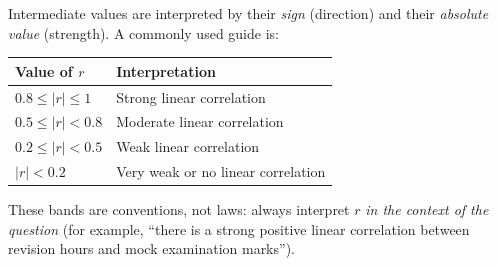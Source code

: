 \documentclass[11pt]{article}
\begin{document}
Intermediate values are interpreted by their \emph{sign} (direction) and their \emph{absolute value} (strength). A commonly used guide is:

\begin{center}
\begin{tabularx}{\linewidth}{|l|X|}
\hline
\rowcolor{popblueL} Value of $r$ & Interpretation \\
\hline
$0.8 \le |r| \le 1$ & Strong linear correlation \\
\hline
$0.5 \le |r| < 0.8$ & Moderate linear correlation \\
\hline
$0.2 \le |r| < 0.5$ & Weak linear correlation \\
\hline
$|r| < 0.2$ & Very weak or no linear correlation \\
\hline
\end{tabularx}
\end{center}

These bands are conventions, not laws: always interpret $r$ \emph{in the context of the question} (for example, ``there is a strong positive linear correlation between revision hours and mock examination marks'').
\end{document}
